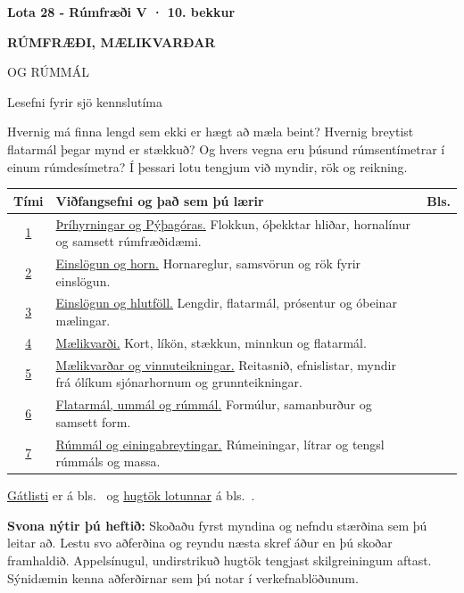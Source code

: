 \documentclass[12pt,letterpaper,fleqn]{article}
\newcommand{\kafli}[1]{\par\Needspace{5\baselineskip}{\large\bfseries #1}\par}
\begin{document}
\begin{center}
{\large\bfseries Lota 28 - Rúmfræði V · 10. bekkur}\par\bigskip
{\fontsize{22}{27}\selectfont\bfseries RÚMFRÆÐI, MÆLIKVARÐAR\par OG RÚMMÁL}\par\medskip
{\large Lesefni fyrir sjö kennslutíma}
\end{center}
\label{yfirlit}
\kafli{Yfirlit}
Hvernig má finna lengd sem ekki er hægt að mæla beint? Hvernig breytist flatarmál þegar mynd er stækkuð? Og hvers vegna eru þúsund rúmsentímetrar í einum rúmdesímetra? Í þessari lotu tengjum við myndir, rök og reikning.

\begin{tabularx}{\linewidth}{@{}c X r@{}}
\toprule
\textbf{Tími}&\textbf{Viðfangsefni og það sem þú lærir}&\textbf{Bls.}\\\midrule
\hyperref[timi:lota28-01]{1}&\hyperref[timi:lota28-01]{Þríhyrningar og Pýþagóras.} Flokkun, óþekktar hliðar, hornalínur og samsett rúmfræðidæmi.&\pageref{timi:lota28-01}\\
\hyperref[timi:lota28-02]{2}&\hyperref[timi:lota28-02]{Einslögun og horn.} Hornareglur, samsvörun og rök fyrir einslögun.&\pageref{timi:lota28-02}\\
\hyperref[timi:lota28-03]{3}&\hyperref[timi:lota28-03]{Einslögun og hlutföll.} Lengdir, flatarmál, prósentur og óbeinar mælingar.&\pageref{timi:lota28-03}\\
\hyperref[timi:lota28-04]{4}&\hyperref[timi:lota28-04]{Mælikvarði.} Kort, líkön, stækkun, minnkun og flatarmál.&\pageref{timi:lota28-04}\\
\hyperref[timi:lota28-05]{5}&\hyperref[timi:lota28-05]{Mælikvarðar og vinnuteikningar.} Reitasnið, efnislistar, myndir frá ólíkum sjónarhornum og grunnteikningar.&\pageref{timi:lota28-05}\\
\hyperref[timi:lota28-06]{6}&\hyperref[timi:lota28-06]{Flatarmál, ummál og rúmmál.} Formúlur, samanburður og samsett form.&\pageref{timi:lota28-06}\\
\hyperref[timi:lota28-07]{7}&\hyperref[timi:lota28-07]{Rúmmál og einingabreytingar.} Rúmeiningar, lítrar og tengsl rúmmáls og massa.&\pageref{timi:lota28-07}\\\bottomrule
\end{tabularx}

\hyperref[gatlisti]{Gátlisti} er á bls.\ \pageref{gatlisti} og \hyperref[hugtok]{hugtök lotunnar} á bls.\ \pageref{hugtok}.
\begin{mundu}\textbf{Svona nýtir þú heftið:} Skoðaðu fyrst myndina og nefndu stærðina sem þú leitar að. Lestu svo aðferðina og reyndu næsta skref áður en þú skoðar framhaldið. Appelsínugul, undirstrikuð hugtök tengjast skilgreiningum aftast. Sýnidæmin kenna aðferðirnar sem þú notar í verkefnablöðunum.\end{mundu}
\end{document}
